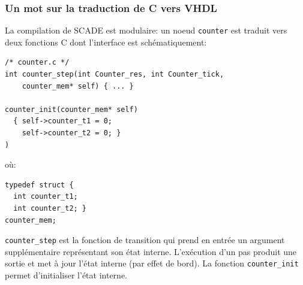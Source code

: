 \documentclass[a4paper]{article}
\begin{document}
\subsubsection{Un mot sur la traduction de C vers VHDL}
La compilation de SCADE est modulaire: un noeud \texttt{counter}
est traduit vers deux fonctions
C dont l'interface est sch\'ematiquement:

\begin{verbatim}
/* counter.c */
int counter_step(int Counter_res, int Counter_tick,
    counter_mem* self) { ... }

counter_init(counter_mem* self)
  { self->counter_t1 = 0;
    self->counter_t2 = 0; }
)
\end{verbatim}
o\`u:
\begin{verbatim}
typedef struct { 
  int counter_t1; 
  int counter_t2; }
counter_mem;
\end{verbatim}
\texttt{counter\_step} est la fonction de transition qui prend
en entr\'ee un argument suppl\'ementaire repr\'esentant son \'etat interne. L'ex\'ecution
d'un pas produit une sortie et met \`a jour l'\'etat interne (par effet de bord).
La fonction \texttt{counter\_init} permet d'initialiser l'\'etat interne.
\end{document}
